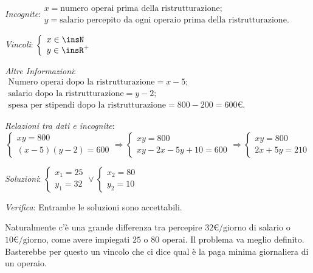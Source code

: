 \emph{Incognite}:$ \begin{array}{l}
x =\text{numero operai prima della ristrutturazione};\\
y= \text{salario percepito da ogni operaio prima della ristrutturazione}.
\end{array}$

\emph{Vincoli}: $\left\{\begin{array}{l}x\in \insN\\y\in \insR^+\end{array}\right.$

\emph{Altre Informazioni}: $ \begin{array}{l}
\text{Numero operai dopo la ristrutturazione} = x-5;\\
\text{salario dopo la ristrutturazione} =y-2;\\
\text{spesa per stipendi dopo la ristrutturazione} =800-200=600\unit{\text{€}}.\end{array}$

\emph{Relazioni tra dati e incognite}:
\begin{equation*}
\left\{\begin{array}{l}{{xy}=800}\\{(x-5)(y-2)=600}\end{array}\right.\Rightarrow \left\{\begin{array}{l}{{xy}=800}\\{{xy}-2x-5y+10=600}\end{array}\right.\Rightarrow \left\{\begin{array}{l}{{xy}=800}\\{2x+5y=210}\end{array}\right.
\end{equation*}

\emph{Soluzioni}: $\left\{\begin{array}{l}{x_1=25}\\{y_1=32}\end{array}\right.\vee \left\{\begin{array}{l}{x_2=80}\\{y_2=10}\end{array}\right.$

\emph{Verifica}: Entrambe le soluzioni sono accettabili.

Naturalmente c'è una grande differenza tra percepire $32\unit{\text{€/giorno}}$ di salario o $ 10\unit{\text{€/giorno}} $, come avere impiegati $ 25 $ o $ 80 $ operai. Il problema va meglio definito. Basterebbe per questo un vincolo che ci dice qual è la paga minima giornaliera di un operaio.

